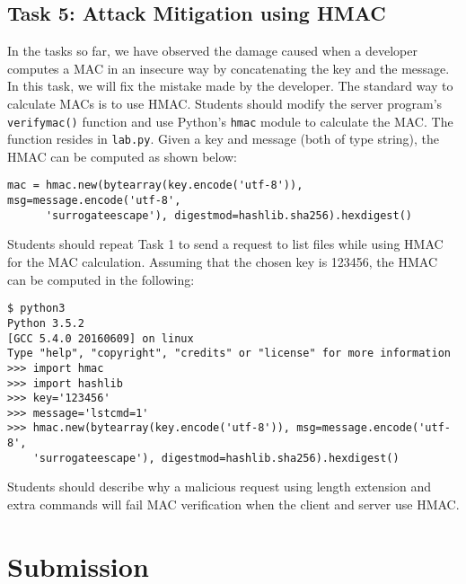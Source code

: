\subsection{Task 5: Attack Mitigation using HMAC}

In the tasks so far, we have observed the damage caused when a developer
computes a MAC in an insecure way by concatenating the key and the message.
In this task, we will fix the mistake made by the developer. The standard
way to calculate MACs is to use HMAC. Students
should modify the server program's \texttt{verify\textunderscore mac()}
function and use Python's \texttt{hmac} module to calculate the MAC. The
function resides in \texttt{lab.py}. Given a key and message (both of type
string), the HMAC can be computed as shown below:

\begin{lstlisting}
mac = hmac.new(bytearray(key.encode('utf-8')), msg=message.encode('utf-8', 
      'surrogateescape'), digestmod=hashlib.sha256).hexdigest()
\end{lstlisting}

Students should repeat Task 1 to send a request to list files while using HMAC for 
the MAC calculation. Assuming that the chosen key is 123456, the HMAC can be computed 
in the following:

\begin{lstlisting}
$ python3
Python 3.5.2
[GCC 5.4.0 20160609] on linux
Type "help", "copyright", "credits" or "license" for more information
>>> import hmac
>>> import hashlib
>>> key='123456'
>>> message='lstcmd=1'
>>> hmac.new(bytearray(key.encode('utf-8')), msg=message.encode('utf-8', 
	'surrogateescape'), digestmod=hashlib.sha256).hexdigest()
\end{lstlisting}

Students should describe why a malicious request using length extension and
extra commands will fail MAC verification when the client and server use
HMAC.


\section{Submission} 
















